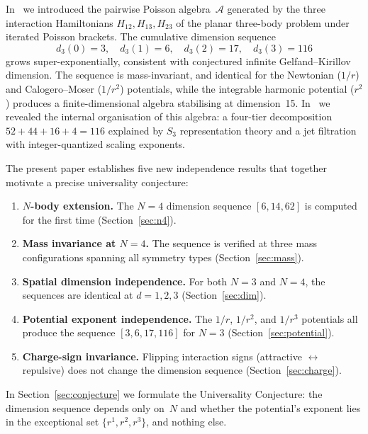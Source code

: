 \documentclass[11pt,a4paper]{article}
\theoremstyle{remark}
\newcommand{\cA}{\mathcal{A}}
\begin{document}
In~\cite{paper1} we introduced the pairwise Poisson
algebra~$\cA$ generated by the three interaction
Hamiltonians $H_{12}, H_{13}, H_{23}$ of the planar
three-body problem under iterated Poisson brackets.  The
cumulative dimension sequence
\[
  d_3(0) = 3, \quad d_3(1) = 6, \quad
  d_3(2) = 17, \quad d_3(3) = 116
\]
grows super-exponentially, consistent with conjectured
infinite Gelfand--Kirillov dimension.  The sequence is
mass-invariant, and identical for the Newtonian ($1/r$)
and Calogero--Moser ($1/r^2$) potentials, while the
integrable harmonic potential ($r^2$) produces a
finite-dimensional algebra stabilising at
dimension~15.  In~\cite{paper2} we revealed the internal
organisation of this algebra: a four-tier decomposition
$52 + 44 + 16 + 4 = 116$ explained by $S_3$
representation theory and a jet filtration with
integer-quantized scaling exponents.

The present paper establishes five new independence
results that together motivate a precise universality
conjecture:

\begin{enumerate}[nosep]
  \item \textbf{$N$-body extension.}  The $N{=}4$
    dimension sequence $[6, 14, 62]$ is computed for the
    first time (Section~\ref{sec:n4}).
  \item \textbf{Mass invariance at $N{=}4$.}  The
    sequence is verified at three mass configurations
    spanning all symmetry types
    (Section~\ref{sec:mass}).
  \item \textbf{Spatial dimension independence.}  For
    both $N{=}3$ and $N{=}4$, the sequences are identical
    at $d = 1, 2, 3$ (Section~\ref{sec:dim}).
  \item \textbf{Potential exponent independence.}  The
    $1/r$, $1/r^2$, and $1/r^3$ potentials all produce
    the sequence $[3, 6, 17, 116]$ for $N{=}3$
    (Section~\ref{sec:potential}).
  \item \textbf{Charge-sign invariance.}  Flipping
    interaction signs (attractive $\leftrightarrow$
    repulsive) does not change the dimension sequence
    (Section~\ref{sec:charge}).
\end{enumerate}

In Section~\ref{sec:conjecture} we formulate the
Universality Conjecture: the dimension sequence depends
only on~$N$ and whether the potential's exponent lies in
the exceptional set $\{r^1, r^2, r^3\}$, and nothing else.


\end{document}
